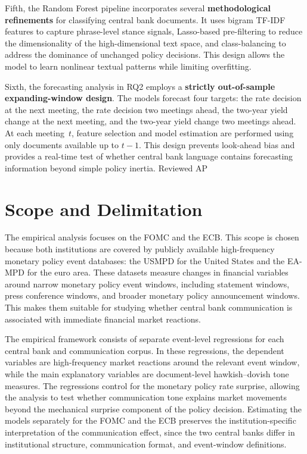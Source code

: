 Fifth, the Random Forest pipeline incorporates several
\textbf{methodological refinements} for classifying central bank
documents. It uses bigram TF-IDF features to capture phrase-level stance
signals, Lasso-based pre-filtering to reduce the dimensionality of the
high-dimensional text space, and class-balancing to address the
dominance of unchanged policy decisions. This design allows the model to
learn nonlinear textual patterns while limiting overfitting.

Sixth, the forecasting analysis in RQ2 employs a \textbf{strictly
out-of-sample expanding-window design}. The models forecast four
targets: the rate decision at the next meeting, the rate decision two
meetings ahead, the two-year yield change at the next meeting, and the
two-year yield change two meetings ahead. At each meeting~$t$, feature
selection and model estimation are performed using only documents
available up to $t-1$. This design prevents look-ahead bias and provides
a real-time test of whether central bank language contains forecasting
information beyond simple policy inertia.
Reviewed AP


\section{Scope and Delimitation}
\label{sec:intro_scope}
The empirical analysis focuses on the FOMC and the ECB. This scope is
chosen because both institutions are covered by publicly available
high-frequency monetary policy event databases: the USMPD for the
United States and the EA-MPD for the euro area. These datasets measure
changes in financial variables around narrow monetary policy event
windows, including statement windows, press conference windows, and
broader monetary policy announcement windows. This makes them suitable
for studying whether central bank communication is associated with
immediate financial market reactions.

The empirical framework consists of separate event-level regressions for
each central bank and communication corpus. In these regressions, the
dependent variables are high-frequency market reactions around the
relevant event window, while the main explanatory variables are
document-level hawkish--dovish tone measures. The regressions control
for the monetary policy rate surprise, allowing the analysis to test
whether communication tone explains market movements beyond the
mechanical surprise component of the policy decision. Estimating the
models separately for the FOMC and the ECB preserves the
institution-specific interpretation of the communication effect, since
the two central banks differ in institutional structure, communication
format, and event-window definitions.


